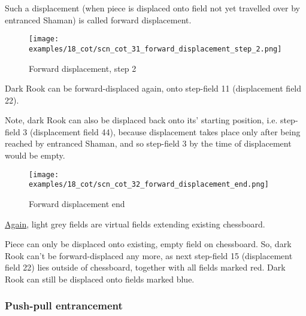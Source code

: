 Such a displacement (when piece is displaced onto field not yet travelled over by entranced Shaman)
is called forward displacement.

\clearpage %

\noindent
\begin{figure}[!h]
\texttt{[image: examples/18\_cot/scn\_cot\_31\_forward\_displacement\_step\_2.png]}
\caption{Forward displacement, step 2}
\label{fig:scn_cot_31_forward_displacement_step_2}
\end{figure}

Dark Rook can be forward-displaced again, onto step-field 11 (displacement field 22).

Note, dark Rook can also be displaced back onto its' starting position, i.e. step-field 3
(displacement field 44), because displacement takes place only after being reached by
entranced Shaman, and so step-field 3 by the time of displacement would be empty.

\clearpage %

\noindent
\begin{figure}[!h]
\texttt{[image: examples/18\_cot/scn\_cot\_32\_forward\_displacement\_end.png]}
\caption{Forward displacement end}
\label{fig:scn_cot_32_forward_displacement_end}
\end{figure}

\hyperref[fig:scn_hd_04_centaur_off_board]{Again},
light grey fields are virtual fields extending existing chessboard.

Piece can only be displaced onto existing, empty field on chessboard. So, dark Rook can't be
forward-displaced any more, as next step-field 15 (displacement field 22) lies outside of
chessboard, together with all fields marked red. Dark Rook can still be displaced onto fields
marked blue.

\clearpage %

\subsubsection*{Push-pull entrancement}

